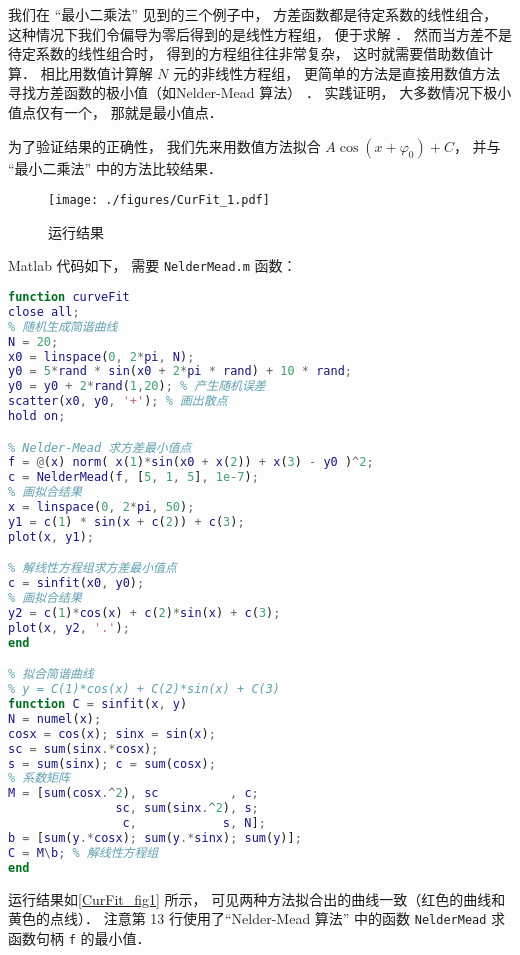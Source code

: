 
我们在 “最小二乘法” 见到的三个例子中， 方差函数都是待定系数的线性组合， 这种情况下我们令偏导为零后得到的是线性方程组， 便于求解 %
． 然而当方差不是待定系数的线性组合时， 得到的方程组往往非常复杂， 这时就需要借助数值计算． 相比用数值计算解 $N$ 元的非线性方程组， 更简单的方法是直接用数值方法寻找方差函数的极小值（如Nelder-Mead 算法） ． 实践证明， 大多数情况下极小值点仅有一个， 那就是最小值点．

为了验证结果的正确性， 我们先来用数值方法拟合 $A\cos (x + \varphi_0) + C$， 并与 “最小二乘法” 中的方法比较结果．

\begin{figure}[ht]
\centering
\texttt{[image: ./figures/CurFit\_1.pdf]}
\caption{运行结果} \label{CurFit_fig1}
\end{figure}

Matlab 代码如下， 需要 \verb|NelderMead.m| 函数：
\begin{lstlisting}[language=matlab, caption=curveFit.m]
function curveFit
close all;
% 随机生成简谐曲线
N = 20;
x0 = linspace(0, 2*pi, N);
y0 = 5*rand * sin(x0 + 2*pi * rand) + 10 * rand;
y0 = y0 + 2*rand(1,20); % 产生随机误差
scatter(x0, y0, '+'); % 画出散点
hold on;

% Nelder-Mead 求方差最小值点
f = @(x) norm( x(1)*sin(x0 + x(2)) + x(3) - y0 )^2;
c = NelderMead(f, [5, 1, 5], 1e-7);
% 画拟合结果
x = linspace(0, 2*pi, 50);
y1 = c(1) * sin(x + c(2)) + c(3);
plot(x, y1);

% 解线性方程组求方差最小值点
c = sinfit(x0, y0);
% 画拟合结果
y2 = c(1)*cos(x) + c(2)*sin(x) + c(3);
plot(x, y2, '.');
end

% 拟合简谐曲线
% y = C(1)*cos(x) + C(2)*sin(x) + C(3)
function C = sinfit(x, y)
N = numel(x);
cosx = cos(x); sinx = sin(x);
sc = sum(sinx.*cosx);
s = sum(sinx); c = sum(cosx);
% 系数矩阵
M = [sum(cosx.^2), sc          , c;
               sc, sum(sinx.^2), s;
                c,            s, N];
b = [sum(y.*cosx); sum(y.*sinx); sum(y)];
C = M\b; % 解线性方程组
end
\end{lstlisting}

运行结果如\autoref{CurFit_fig1} 所示， 可见两种方法拟合出的曲线一致（红色的曲线和黄色的点线）． 注意第 13 行使用了“Nelder-Mead 算法” 中的函数 \verb|NelderMead| 求函数句柄 \verb|f| 的最小值．
